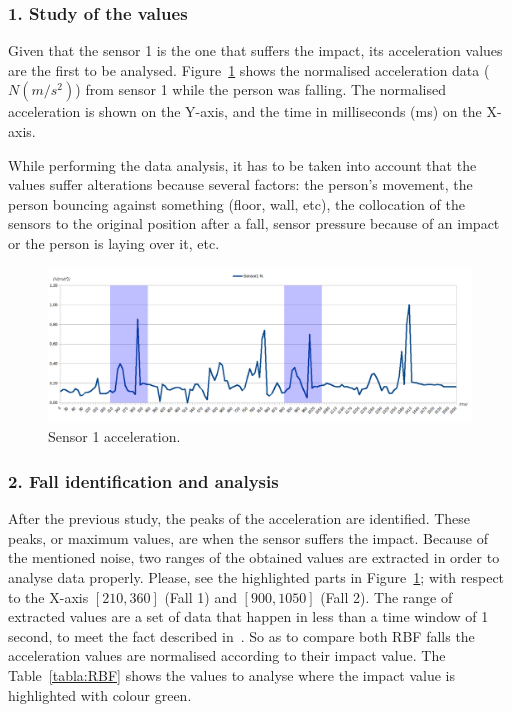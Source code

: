 \documentclass[journal]{IEEEtran}
\begin{document}
\subsubsection*{1. Study of the values} Given that the sensor 1 is the one that suffers the
impact, its acceleration values are the first to be analysed. Figure~\ref{fig:Sensor1Sombras} 
shows the normalised acceleration data ($N(m/s^2)$) from sensor 1 while the person was falling. The normalised acceleration is
shown on the Y-axis, and the 
time in milliseconds (ms) on the X-axis.

While performing the data analysis, it has to be taken into account that the values suffer 
alterations because several factors: the person's movement, the person bouncing against something 
(floor, wall, etc), the collocation of the sensors to the original position after a fall, 
sensor pressure because of an impact or the person is laying over it, etc.

 \begin{figure}[!ht]
  \includegraphics[scale=0.19]{img/Sensor1Sombras}
  \caption[Sensor 1 acceleration]{Sensor 1 acceleration.}
  \label{fig:Sensor1Sombras}
\end{figure}

\subsubsection*{2. Fall identification and analysis} After the previous study, the peaks of the acceleration are identified. 
These peaks, or maximum values, are when the sensor suffers the
impact. Because of the mentioned noise, two ranges of the obtained 
values are extracted in order to analyse data properly. Please, see the highlighted parts in Figure~\ref{fig:Sensor1Sombras};
with respect to the X-axis $[210, 360]$ (Fall 1) and $[900, 1050]$ (Fall 2). The range of extracted values are a set of data that 
happen in less than a time window of 1 second, to meet the fact described in~\cite{Luder2009}. So as to compare both RBF falls
the acceleration values are normalised according to their impact value. The Table~\ref{tabla:RBF} 
shows the values to analyse where the impact value is highlighted with colour green.
\end{document}
